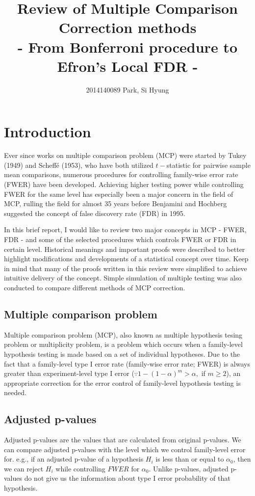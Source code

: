 \documentclass[a4paper, 11pt, oneside]{article}
\title{Review of Multiple Comparison Correction methods\\
	\Large - From Bonferroni procedure to Efron's Local FDR - }
\author{2014140089 Park, Si Hyung}
\begin{document}
\maketitle

\section{Introduction}
    Ever since works on multiple comparison problem (MCP) were started by Tukey (1949) and Scheff\'e (1953), who have both utilized $t-$statistic for pairwise sample mean comparisons, numerous procedures for controlling family-wise error rate (FWER) have been developed. Achieving higher testing power while controlling FWER for the same level has especially been a major concern in the field of MCP, rulling the field for almost 35 years before Benjamini and Hochberg suggested the concept of false discovery rate (FDR) in 1995. \par
    In this brief report, I would like to review two major concepts in MCP - FWER, FDR - and some of the selected procedures which controls FWER or FDR in certain level. Historical meanings and important proofs were described to better highlight modifications and developments of a statistical concept over time. Keep in mind that many of the proofs written in this review were simplified to achieve intuitive delivery of the concept. Simple simulation of multiple testing was also conducted to compare different methods of MCP correction.

\subsection{Multiple comparison problem}
Multiple comparison problem (MCP), also known as multiple hypothesis tesing problem or multiplicity problem, is a problem which occurs when a family-level hypothesis testing is made based on a set of individual hypotheses. Due to the fact that a family-level type I error rate (family-wise error rate; FWER) is always greater than experiment-level type I error ($\because 1-(1-\alpha)^m > \alpha,$ if $m \geq 2$), an appropriate correction for the error control of family-level hypothesis testing is needed.

\subsection{Adjusted p-values}
Adjusted p-values are the values that are calculated from original p-values. We can compare adjusted p-values with the level which we control family-level error for. e.g., if an adjusted p-value of a hypothesis $H_i$ is less than or equal to $\alpha_0$, then we can reject $H_i$ while controlling $FWER$ for $\alpha_0$. Unlike p-values, adjusted p-values do not give us the information about type I error probability of that hypothesis.
\end{document}
